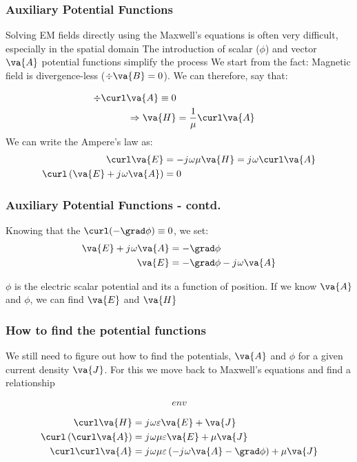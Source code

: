 \documentclass[10pt, compress]{beamer}
\renewcommand{\O}{\omega}  %
\newcommand{\E}{\varepsilon}  %
\renewcommand{\u}{\mu}  %
\renewcommand{\j}{{j}\mkern1mu} %
\begin{document}
\begin{frame}
  \frametitle{Auxiliary Potential Functions}
  \begin{outline}
    \1 Solving EM fields directly using the Maxwell's equations is often very difficult, especially in the spatial domain
    \1 The introduction of scalar (${\phi}$) and vector $\va{A}$ potential functions simplify the process
    \1 We start from the fact:
    \2 Magnetic field is divergence-less ($\div \va{B} = 0$). We can therefore, say that:
  \end{outline}
  \begin{align*}
    \div \curl \va{A} \equiv 0 \\
    \Rightarrow \va{H} &= \frac{1}{\u} \curl \va{A}
  \end{align*}
  We can write the Ampere's law as:
  \begin{align*}
    \curl \va{E} &= - \j \O \u \va{H} = \j \O \curl \va{A} \\
    \curl \left (\va{E} + \j \O \va{A} \right) &= 0
  \end{align*}
\end{frame}

\begin{frame}
  \frametitle{Auxiliary Potential Functions - contd.}
  Knowing that the $\curl (-\grad \phi) \equiv 0 $, we set:
  \begin{align*}
    \va{E} + \j \O \va{A} &= -\grad \phi \\
    \va{E} &= -\grad \phi - \j \O \va{A}
  \end{align*}
\begin{outline}
  \1 $\phi$ is the electric scalar potential and its a function of position.
  \1 If we know $\va{A}$ and $\phi$, we can find $\va{E}$ and $\va{H}$
\end{outline}
\end{frame}



\begin{frame}
  \frametitle{How to find the potential functions}

  \begin{outline}
    \1 We still need to figure out how to find the potentials,   $\va{A}$ and $\phi$ for a given current density $\va{J}$.
    \1 For this we move back to Maxwell's equations and find a relationship
  \end{outline}
\begin{align*}
  \begin{equation}
    env
  \end{equation}
\end{align*}



  \begin{align*}
     \curl \va{H} &= \j \O \E \va{E} + \va{J} \\
     \curl \left( \curl \va{A} \right) &= \j \O \u \E \va{E} + \u \va{J} \\
     \curl \curl \va{A} &= \j \O \u \E \left(-\j \O \va{A} - \grad \phi \right) + \u \va{J}
  \end{align*}
\end{frame}
\end{document}
